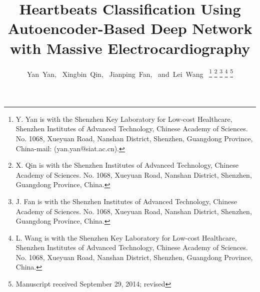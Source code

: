 \documentclass[journal]{IEEEtran}
\begin{document}
%
\title{Heartbeats Classification Using Autoencoder-Based Deep Network with Massive Electrocardiography}
%
%
%

\author{Yan~Yan,~
        Xingbin~Qin,~
        Jianping~Fan,~
        and~Lei~Wang~%
\thanks{Y. Yan is with the Shenzhen Key Laboratory for Low-cost Healthcare, Shenzhen Institutes of Advanced Technology, Chinese Academy of Sciences. No. 1068, Xueyuan Road, Nanshan District,
Shenzhen, Guangdong Province, China-mail: (yan.yan@siat.ac.cn).}%
\thanks{X. Qin is with the Shenzhen Institutes of Advanced Technology, Chinese Academy of Sciences.
No. 1068, Xueyuan Road, Nanshan District, Shenzhen, Guangdong Province, China.}%
\thanks{J. Fan is with the Shenzhen Institutes of Advanced Technology, Chinese Academy of Sciences. No. 1068, Xueyuan Road, Nanshan District, Shenzhen, Guangdong Province, China.}%
\thanks{L. Wang is with the Shenzhen Key Laboratory for Low-cost Healthcare, Shenzhen Institutes of Advanced Technology, Chinese Academy of Sciences.
No. 1068, Xueyuan Road, Nanshan District,
Shenzhen, Guangdong Province, China.}%
\thanks{Manuscript received September 29, 2014; revised}}

% 
%
\end{document}
